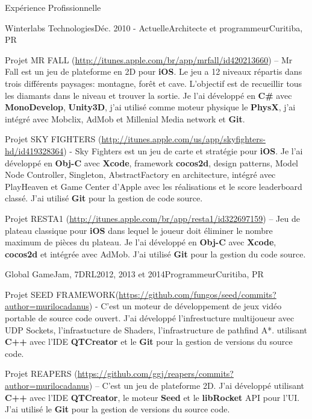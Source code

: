 \documentclass{resume}
\begin{document}
\begin{rSection}{Expérience Profissionnelle}
\begin{rSubsection}{Winterlabs Technologies}{Déc. 2010 - Actuelle}{Architecte et programmeur}{Curitiba, PR}
    \item Projet MR FALL (\url{http://itunes.apple.com/br/app/mrfall/id420213660}) – Mr Fall est un jeu de plateforme en 2D pour \textbf{iOS}. Le jeu a 12 niveaux répartis dans trois différents paysages: montagne, forêt et cave. L'objectif est de recueillir tous les diamants dans le niveau et trouver la sortie. Je l’ai développé en \textbf{C\#} avec \textbf{MonoDevelop}, \textbf{Unity3D}, j'ai utilisé comme moteur physique le \textbf{PhysX}, j'ai intégré avec Mobclix, AdMob et Millenial Media network et \textbf{Git}. \\
    \item Projet SKY FIGHTERS (\url{http://itunes.apple.com/us/app/skyfighters-hd/id419328364}) - Sky Fighters est un jeu de carte et stratégie pour \textbf{iOS}. Je l’ai développé en \textbf{Obj-C} avec \textbf{Xcode}, framework \textbf{cocos2d}, design patterns, Model Node Controller, Singleton, AbstractFactory en architecture, intégré avec PlayHeaven et Game Center d'Apple avec les réalisations et le score leaderboard classé. J’ai utilisé \textbf{Git} pour la gestion de code source. \\
    \item Projet RESTA1 (\url{http://itunes.apple.com/br/app/resta1/id322697159}) – Jeu de plateau classique pour \textbf{iOS} dans lequel le joueur doit éliminer le nombre maximum de pièces du plateau. Je l’ai développé en \textbf{Obj-C} avec \textbf{Xcode}, \textbf{cocos2d} et intégrée avec AdMob. J’ai utilisé \textbf{Git} pour la gestion du code source.
    \end{rSubsection}
    \begin{rSubsection}{Global GameJam, 7DRL}{2012, 2013 et 2014}{Programmeur}{Curitiba, PR}
    \item Projet SEED FRAMEWORK(\url{https://github.com/fungos/seed/commits?author=murilocadanus}) - C'est un moteur de développement de jeux vidéo portable de source code ouvert. J'ai développé l'infrestucture multijoueur avec UDP Sockets, l'infrastucture de Shaders, l'infrastructure de pathfind A*. utilisant \textbf{C++} avec l'IDE \textbf{QTCreator} et le \textbf{Git} pour la gestion de versions du source code. \\
    \item Projet REAPERS (\url{https://github.com/ggj/reapers/commits?author=murilocadanus}) – C'est un jeu de plateforme 2D. J'ai développé utilisant \textbf{C++} avec l'IDE \textbf{QTCreator}, le moteur \textbf{Seed} et le \textbf{libRocket} API pour l'UI.  J'ai utilisé le \textbf{Git} pour la gestion de versions du source code. \\

\end{rSubsection}
\end{rSection}
\end{document}
